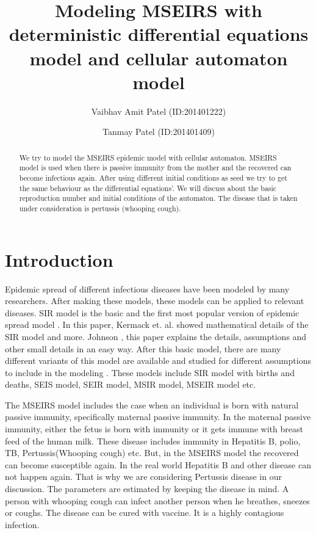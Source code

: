 \documentclass[prl,12pt,citeautoscript,reprint]{revtex4-1}
\begin{document}
\title{Modeling MSEIRS with deterministic differential equations model and cellular automaton model}
\author{Vaibhav Amit Patel (ID:201401222)}
\author{Tanmay Patel (ID:201401409)}




\begin{abstract}
We try to model the MSEIRS epidemic model with cellular automaton. MSEIRS model is used when there is passive immunity from the mother and the recovered can become infectious again. After using different initial conditions as seed we try to get the same behaviour as the differential equations’. We will discuss about the basic reproduction number and initial conditions of the automaton. The disease that is taken under consideration is pertussis (whooping cough).
\end{abstract}
\maketitle
\section{Introduction}
Epidemic spread of different infectious diseases have been modeled by many researchers. After making these models, these models can be applied to relevant diseases. SIR model is the basic and the first most popular version of epidemic spread model \cite{kermack1927contribution}. In this paper, Kermack et. al. showed mathematical details of the SIR model and more. Johnson \cite{johnson2009mathematical}, this paper explains the details, assumptions and other small details in an easy way. After this basic model, there are many different variants of this model are available and studied for different assumptions to include in the modeling  \cite{allen1994some,korobeinikov2004lyapunov,jin2007sirs,li1995global,anguelov2009comparison} . These models include SIR model with births and deaths, SEIS model, SEIR model, MSIR model, MSEIR model etc. 
\par 
The MSEIRS model includes the case when an individual is born with natural passive immunity, specifically maternal passive immunity. In the maternal passive immunity, either the fetus is born with immunity or it gets immune with breast feed of the human milk. These disease includes immunity in Hepatitis B, polio, TB, Pertussis(Whooping cough) etc. But, in the MSEIRS model the recovered can become susceptible again. In the real world Hepatitis B and other disease can not happen again. That is why we are considering Pertussis disease in our discussion. The parameters are estimated by keeping the disease in mind. A person with whooping cough can infect another person when he breathes, sneezes or coughs. The disease can be cured with vaccine. It is a highly contagious infection.
\end{document}
